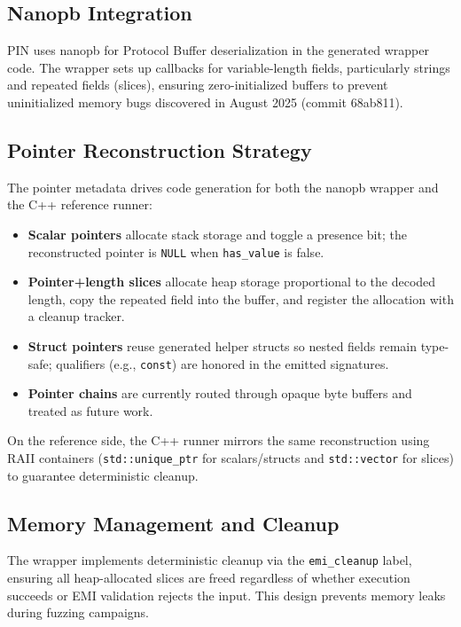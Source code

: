 \documentclass[doublespace,nopageskip]{VTthesis}
\begin{document}
  

  \subsection{Nanopb Integration}

  PIN uses nanopb for Protocol Buffer deserialization in the generated wrapper code. The wrapper sets up callbacks for variable-length fields, particularly strings and repeated fields (slices), ensuring zero-initialized buffers to prevent uninitialized memory bugs discovered in August 2025 (commit 68ab811).

  \subsection{Pointer Reconstruction Strategy}

  The pointer metadata drives code generation for both the nanopb wrapper and the C++ reference runner:

  \begin{itemize}
      \item \textbf{Scalar pointers} allocate stack storage and toggle a presence bit; the reconstructed pointer is \texttt{NULL} when \texttt{has\_value} is false.
      \item \textbf{Pointer+length slices} allocate heap storage proportional to the decoded length, copy the repeated field into the buffer, and register the allocation with a cleanup tracker.
      \item \textbf{Struct pointers} reuse generated helper structs so nested fields remain type-safe; qualifiers (e.g., \texttt{const}) are honored in the emitted signatures.
      \item \textbf{Pointer chains} are currently routed through opaque byte buffers and treated as future work.
  \end{itemize}

  On the reference side, the C++ runner mirrors the same reconstruction using RAII containers (\texttt{std::unique\_ptr} for scalars/structs and \texttt{std::vector} for slices) to guarantee deterministic cleanup.

  \subsection{Memory Management and Cleanup}

  The wrapper implements deterministic cleanup via the \texttt{emi\_cleanup} label, ensuring all heap-allocated slices are freed regardless of whether execution succeeds or EMI validation rejects the input. This design prevents memory leaks during fuzzing campaigns.
\end{document}
